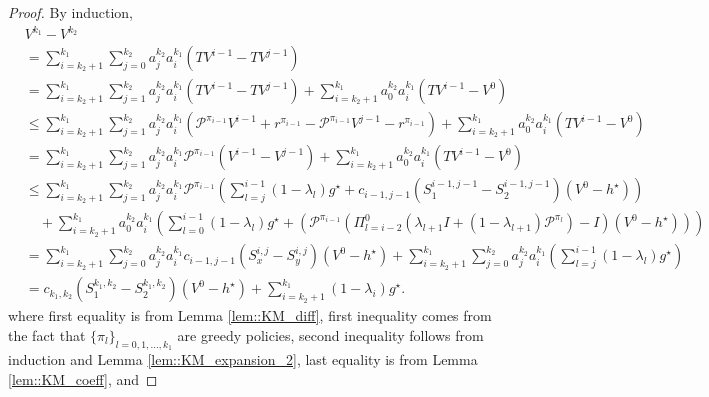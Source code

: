\documentclass{article} %
\newcommand{\cP}{\mathcal{P}}
\newcommand*{\para}[1]{\left({#1}\right)}
\begin{document}
\begin{proof}
By induction,
    \begin{align*}
        &V^{k_1}-V^{k_2} 
        \\&=\sum^{k_1}_{i=k_2+1} \sum^{k_2}_{j=0}a^{k_2}_j  a^{k_1}_i (TV^{i-1}-TV^{j-1})
         \\& = \sum^{k_1}_{i=k_2+1} \sum^{k_2}_{j=1} a^{k_2}_j  a^{k_1}_i(TV^{i-1}-TV^{j-1})+\sum^{k_1}_{i=k_2+1} a^{k_2}_{0}  a^{k_1}_i (TV^{i-1}-V^{0})
        \\& \le \sum^{k_1}_{i=k_2+1} \sum^{k_2}_{j=1}a^{k_2}_j  a^{k_1}_i (\cP^{\pi_{i-1}}V^{i-1}+r^{\pi_{i-1}}-\cP^{\pi_{i-1}}V^{j-1}-r^{\pi_{i-1}})+\sum^{k_1}_{i=k_2+1} a^{k_2}_{0}  a^{k_1}_i (TV^{i-1}-V^{0})
        \\& = \sum^{k_1}_{i=k_2+1} \sum^{k_2}_{j=1} a^{k_2}_j  a^{k_1}_i\cP^{\pi_{i-1}} (V^{i-1}-V^{j-1})+\sum^{k_1}_{i=k_2+1} a^{k_2}_{0}  a^{k_1}_i (TV^{i-1}-V^{0})
        \\& \le \sum^{k_1}_{i=k_2+1} \sum^{k_2}_{j=1} a^{k_2}_j  a^{k_1}_i\cP^{\pi_{i-1}} \para{ \sum^{i-1}_{l=j} (1-\lambda_{l})g^{\star}+c_{i-1, j-1}(S^{i-1,j-1}_{1}-S^{i-1,j-1}_{2})(V^0-h^{\star}) }
        \\&\quad + \sum^{k_1}_{i=k_2+1} a^{k_2}_{0}  a^{k_1}_i \para{\sum^{i-1}_{l=0} (1-\lambda_{l})g^{\star}+\para{\cP^{\pi_{i-1}}\para{ \Pi^{0}_{l=i-2}(\lambda_{l+1}I+(1-\lambda_{l+1}) \cP^{\pi_l})-I} (V^0-h^{\star})}}
        \\& =\sum^{k_1}_{i=k_2+1} \sum^{k_2}_{j=0} a^{k_2}_j  a^{k_1}_i c_{i-1,j-1}(S^{i,j}_{x}-S^{i,j}_{y}) (V^0-h^{\star}) +\sum^{k_1}_{i=k_2+1} \sum^{k_2}_{j=0} a^{k_2}_j  a^{k_1}_i \para{\sum^{i-1}_{l=j} (1-\lambda_{l})g^{\star}}
        \\& = c_{k_1,k_2}(S^{k_1,k_2}_1-S^{k_1,k_2}_2) (V^0-h^{\star})+ \sum^{k_1}_{i=k_2+1} (1-\lambda_{i})g^{\star}.
    \end{align*}
    where first equality is from Lemma \ref{lem::KM_diff}, first inequality comes from the fact that $\{\pi_l\}_{l=0,1,\dots,k_1}$ are greedy policies, second inequality follows from induction and Lemma \ref{lem::KM_expansion_2}, last equality is from Lemma \ref{lem::KM_coeff}, and 

\end{proof}
\end{document}
